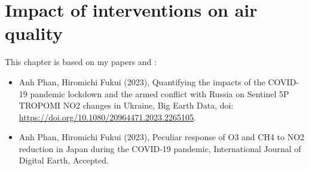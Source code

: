 \chapter{Impact of interventions on air quality} \label{chap3}
\renewcommand{\headrulewidth}{0pt}
\lhead[\thepage]{\rightmark}
\rhead[\rightmark]{\thepage}
\cfoot[]{}
This chapter is based on my papers \citep{aqukrrus2023} and \citep{aqjp2023}:
\begin{itemize}
    \item Anh Phan, Hiromichi Fukui (2023), Quantifying the impacts of the COVID-19 pandemic lockdown and the armed conflict with Russia on Sentinel 5P TROPOMI NO2 changes in Ukraine, Big Earth Data, doi: \url{https://doi.org/10.1080/20964471.2023.2265105}.
    \item Anh Phan, Hiromichi Fukui (2023), Peculiar response of O3 and CH4 to NO2 reduction in Japan during the COVID-19 pandemic, International Journal of Digital Earth, Accepted.
\end{itemize}

